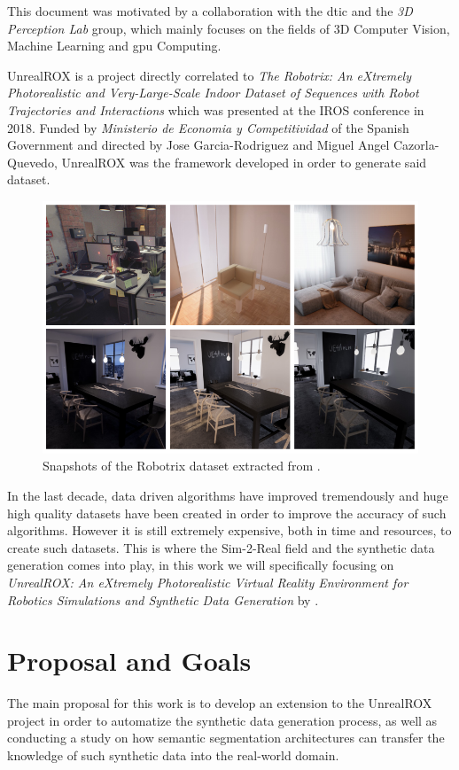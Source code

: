 This document was motivated by a collaboration with the \gls{dtic} and the \textit{3D Perception Lab} group, which mainly focuses on the fields of 3D Computer Vision, Machine Learning and \gls{gpu} Computing.

UnrealROX is a project directly correlated to \textit{The Robotrix: An eXtremely Photorealistic and Very-Large-Scale Indoor Dataset of Sequences with Robot Trajectories and Interactions} \cite{DBLP:journals/corr/abs-1901-06514} which was presented at the IROS conference in 2018. Funded by \textit{Ministerio de Economia y Competitividad} of the Spanish Government and directed by Jose Garcia-Rodriguez and Miguel Angel Cazorla-Quevedo, UnrealROX was the framework developed in order to generate said dataset.

\begin{figure}
	\centering
	\includegraphics[width=0.7\linewidth]{archivos/robotrix}
		\caption{Snapshots of the Robotrix dataset extracted from \cite{DBLP:journals/corr/abs-1901-06514}.}
	\label{fig:robotrix}
\end{figure}

In the last decade, data driven algorithms have improved tremendously and huge high quality datasets have been created in order to improve the accuracy of such algorithms. However it is still extremely expensive, both in time and resources, to create such datasets. This is where the Sim-2-Real field and the synthetic data generation comes into play, in this work we will specifically focusing on \textit{UnrealROX: An eXtremely Photorealistic Virtual Reality Environment for Robotics Simulations and Synthetic Data Generation} by \cite{DBLP:journals/corr/abs-1810-06936}.

\section{Proposal and Goals}
\label{sec:goals}
The main proposal for this work is to develop an extension to the UnrealROX project in order to automatize the synthetic data generation process, as well as conducting a study on how semantic segmentation architectures can transfer the knowledge of such synthetic data into the real-world domain.


